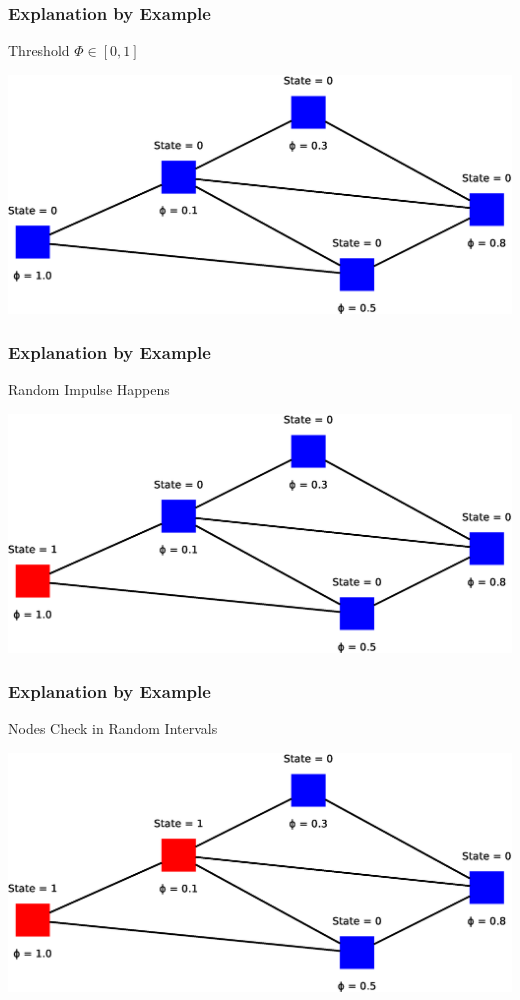\begin{frame}
    \frametitle{Explanation by Example}
    \begin{itemize}
        \gitem Threshold $\Phi \in [0, 1]$
    \end{itemize}
    \vspace{8pt}
    \includegraphics[width=\textwidth]{img/model4}
    \vfill
\end{frame}

\begin{frame}
    \frametitle{Explanation by Example}
    \begin{itemize}
        \gitem Random Impulse Happens
    \end{itemize}
    \vspace{8.6pt}
    \includegraphics[width=\textwidth]{img/model5}
    \vfill
\end{frame}

\begin{frame}
    \frametitle{Explanation by Example}
    \begin{itemize}
        \gitem Nodes Check in Random Intervals
    \end{itemize}
    \vspace{10.8pt}
    \includegraphics[width=\textwidth]{img/model6}
    \vfill
\end{frame}

